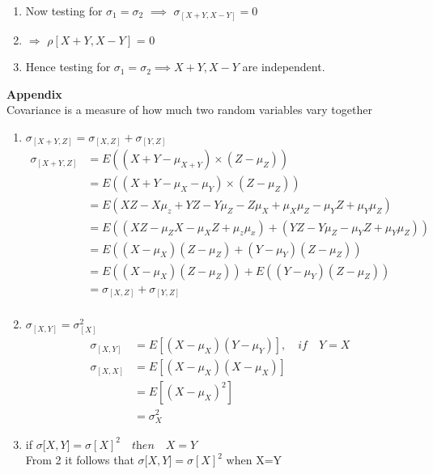 \documentclass{article}
\begin{document}
\begin{enumerate}
\begin{enumerate}
\item Now testing for $\sigma_1 = \sigma_2 $ $\implies$ $\sigma_{[X+Y,X-Y]}= 0$
\item $\Rightarrow$ $\rho[X+Y,X-Y]$ =  0
\item Hence testing for   $\sigma_1 = \sigma_2 \implies X+Y, X-Y$ are independent.
\end{enumerate}
\end{enumerate}

\large \textbf{Appendix}\\
Covariance is a measure of how much two random variables vary together
\begin{enumerate}
    \item \large $\sigma_{[X+Y,Z]} = \sigma_{[X,Z]} + \sigma_{[Y,Z]}$
    \begin{align*}
        \sigma_{[X+Y,Z]} &= E((X+Y - \mu_{X+Y}) \times (Z -\mu_{Z} ))\\
        &= E((X+Y - \mu_{X}-\mu_{Y}) \times (Z -\mu_{Z} ))\\
        &= E(XZ-X\mu_z+YZ-Y\mu_Z-Z\mu_X+\mu_X\mu_Z-\mu_YZ+\mu_Y\mu_Z)\\
        &= E((XZ-\mu_ZX-\mu_XZ+\mu_z\mu_x) + (YZ-Y\mu_Z-\mu_YZ+\mu_Y\mu_Z))\\
        &= E((X-\mu_X)(Z-\mu_Z)+ (Y-\mu_Y)(Z-\mu_Z))\\
        &= E((X-\mu_X)(Z-\mu_Z)) + E((Y-\mu_Y)(Z-\mu_Z))\\
        &=\sigma_{[X,Z]} + \sigma_{[Y,Z]}\\
    \end{align*}
    
    \item \large  $ \sigma_{[X,Y]}= \sigma_{[X]}^2$\\
    \begin{align*}
        \sigma_{[X,Y]} &= E[(X-\mu_X) (Y-\mu_Y)],
        \quad \textit{if}\quad Y=X \\
        \sigma_{[X,X]} &= E[(X-\mu_X) (X-\mu_X)]\\
        &=E[(X-\mu_X)^2]\\
        &=\sigma_X^2
    \end{align*}
    
    \item if $\sigma{[X,Y}] = \sigma{[X]}^2 \quad \textit{then} \quad X=Y$\\
    From 2 it follows that  $\sigma{[X,Y}] = \sigma{[X]}^2$  when X=Y
\end{enumerate}
\end{document}
